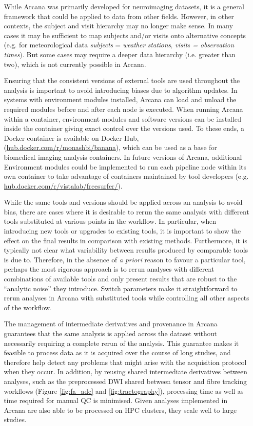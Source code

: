 \documentclass[smallextended]{svjour3}       %
\begin{document}
While Arcana was primarily developed for neuroimaging datasets, it is a
general framework that could be applied to data from other fields.
However, in other contexts, the subject and visit hierarchy may no
longer make sense. In many cases it may be sufficient to map subjects
and/or visits onto alternative concepts (e.g. for meteorological data
\emph{subjects} = \emph{weather stations}, \emph{visits = observation
times}). But some cases may require a deeper data hierarchy (i.e.
greater than two), which is not currently possible in Arcana.

Ensuring that the consistent versions of external tools are used
throughout the analysis is important to avoid introducing biases due to
algorithm updates. In systems with environment modules \citep{furlani_modules:_1991}
installed, Arcana can load and unload the required modules before and
after each node is executed. When running Arcana within a container,
environment modules and software versions can be installed inside the
container giving exact control over the versions used. To these ends, a
Docker container is available on Docker Hub,
(\url{hub.docker.com/r/monashbi/banana}), which can be used as a
base for biomedical imaging analysis containers. In future versions of Arcana,
additional Environment modules could be implemented to run each pipeline
node within its own container to take advantage of
containers maintained by tool developers (e.g. 
\url{hub.docker.com/r/vistalab/freesurfer/}).

While the same tools and versions should be applied across an analysis
to avoid bias, there are cases where it is desirable to rerun the same
analysis with different tools substituted at various points in the
workflow. In particular, when introducing new tools or upgrades to
existing tools, it is important to show the effect on the final results
in comparison with existing methods. Furthermore, it is typically not
clear what variability between results produced by comparable tools is
due to. Therefore, in the absence of \emph{a priori} reason to favour a
particular tool, perhaps the most rigorous approach is to rerun analyses
with different combinations of available tools and only present results
that are robust to the ``analytic noise'' \citep{maumet:inserm-01886089} they introduce.
Switch parameters make it straightforward to rerun analyses in Arcana
with substituted tools while controlling all other aspects of the
workflow.

The management of intermediate derivatives and provenance in Arcana
guarantees that the same analysis is applied across the dataset without
necessarily requiring a complete rerun of the analysis. This guarantee
makes it feasible to process data as it is acquired over the course of
long studies, and therefore help detect any problems that might arise
with the acquisition protocol when they occur. In addition, by reusing
shared intermediate derivatives between analyses, such as the
preprocessed DWI shared between tensor and fibre tracking workflows
(Figure \ref{fig:fa_adc} and \ref{fig:tractography}), processing time as
well as time required for manual QC is minimised. Given analyses implemented
in Arcana are also able to be processed on HPC clusters, they scale well to large studies.
\end{document}
